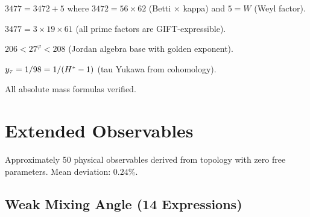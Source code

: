 \begin{theorem}\label{thm:m_tau_m_e_expanded}
    \leanok
    $3477 = 3472 + 5$ where $3472 = 56 \times 62$ (Betti $\times$ kappa) and $5 = W$ (Weyl factor).
\end{theorem}

\begin{theorem}\label{thm:m_tau_m_e_primes}
    \leanok
    $3477 = 3 \times 19 \times 61$ (all prime factors are GIFT-expressible).
\end{theorem}

\begin{theorem}[$m_\mu/m_e$ Bounds]\label{thm:m_mu_m_e_bounds}
    \leanok
    $206 < 27^\varphi < 208$ (Jordan algebra base with golden exponent).
\end{theorem}

\begin{theorem}\label{thm:y_tau}
    \leanok
    $y_\tau = 1/98 = 1/(H^* - 1)$ (tau Yukawa from cohomology).
\end{theorem}

\begin{theorem}\label{thm:mass_formulas}
    \leanok
    All absolute mass formulas verified.
\end{theorem}


\chapter{Extended Observables}\label{chap:observables}

Approximately 50 physical observables derived from topology with zero free parameters.
Mean deviation: $0.24\%$.

\section{Weak Mixing Angle (14 Expressions)}

